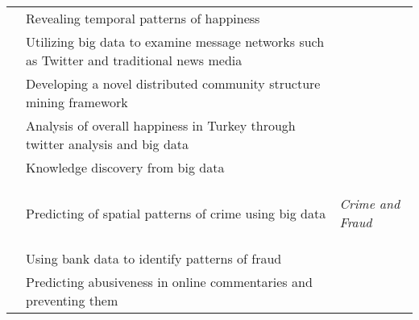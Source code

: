 \begin{center}
\begin{longtable}{|p{4cm}|p{8cm}|p{1cm}|}
        \cite{Dodds2011}           & Revealing temporal patterns of happiness                                                                                                      &                                             \\

        \cite{Guo2015}             & Utilizing big data to examine message networks such as Twitter and traditional news media                                                     &                                             \\

        \cite{Jin2015}             & Developing a novel distributed community structure mining framework                                                                           &                                             \\

        \cite{Durahim2015}         & Analysis of overall happiness in Turkey through twitter analysis and big data                                                                 &                                             \\

        \cite{Bohlouli2015}        & Knowledge discovery from big data                                                                                                             &                                             \\

        \hline
        \cite{Chainey2008}         & Predicting of spatial patterns of crime using big data                                                                                        & \multirow{1}{*}{\begin{turn}{-90} \textit{Crime and Fraud} \end{turn}}  \\

        \cite{Li2012}              & Using bank data to identify patterns of fraud                                                                                                 &                                             \\

        \cite{Liao2015}            & Predicting abusiveness in online commentaries and preventing them                                                                             &                                             \\


\end{longtable}
\end{center}
